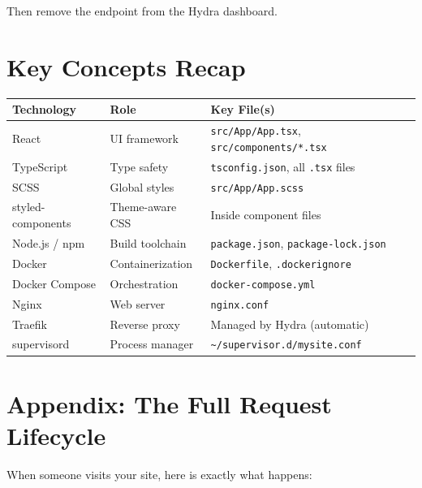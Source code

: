 \documentclass[11pt, letterpaper]{article}
\begin{document}
Then remove the endpoint from the Hydra dashboard.

\section{Key Concepts Recap}

\begin{center}
\begin{tabularx}{\textwidth}{l l X}
\toprule
\textbf{Technology} & \textbf{Role} & \textbf{Key File(s)} \\
\midrule
React & UI framework & \texttt{src/App/App.tsx}, \texttt{src/components/*.tsx} \\
TypeScript & Type safety & \texttt{tsconfig.json}, all \texttt{.tsx} files \\
SCSS & Global styles & \texttt{src/App/App.scss} \\
styled-components & Theme-aware CSS & Inside component files \\
Node.js / npm & Build toolchain & \texttt{package.json}, \texttt{package-lock.json} \\
Docker & Containerization & \texttt{Dockerfile}, \texttt{.dockerignore} \\
Docker Compose & Orchestration & \texttt{docker-compose.yml} \\
Nginx & Web server & \texttt{nginx.conf} \\
Traefik & Reverse proxy & Managed by Hydra (automatic) \\
supervisord & Process manager & \texttt{\textasciitilde/supervisor.d/mysite.conf} \\
\bottomrule
\end{tabularx}
\end{center}

\section{Appendix: The Full Request Lifecycle}

When someone visits your site, here is exactly what happens:
\end{document}
